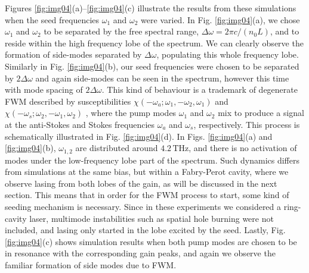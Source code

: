 \documentclass[10pt]{article}
\begin{document}
	Figures \ref{fig:img04}(a)--\ref{fig:img04}(c) illustrate the results from these simulations when the seed frequencies
	$\omega_{1}$ and $\omega_{2}$ were varied. In Fig. \ref{fig:img04}(a), we chose
	$\omega_{1}$ and $\omega_{2}$ to be separated by the free spectral range,
	$\Delta\omega=2\pi c/\left(  n_{0}L\right)  $, and to reside within the high
	frequency lobe of the spectrum. We can clearly observe the formation of
	side-modes separated by $\Delta\omega$, populating this whole frequency lobe.
	Similarly in Fig. \ref{fig:img04}(b), our seed frequencies were chosen to be
	separated by $2\Delta\omega$ and again side-modes can be seen in the spectrum,
	however this time with mode spacing of $2\Delta\omega$. This kind of behaviour
	is a trademark of degenerate FWM described by susceptibilities $\chi
	(-\omega_{a};\omega_{1},-\omega_{2},\omega_{1})$ and $\chi(-\omega_{s}%
	;\omega_{2},-\omega_{1},\omega_{2})$ \cite{butcher1991elements}, where the
	pump modes $\omega_{1}$ and $\omega_{2}$ mix to produce a signal at the
	anti-Stokes and Stokes frequencies $\omega_{a}$ and $\omega_{s}$,
	respectively. This process is schematically illustrated in Fig.
	\ref{fig:img04}(d). In Figs. \ref{fig:img04}(a) and \ref{fig:img04}(b), $\omega_{1,2}$ are distributed
	around $4.2{\,}\mathrm{THz}$, and there is no activation of modes under the
	low-frequency lobe part of the spectrum. Such dynamics differs from simulations 
	at the same bias, but within a Fabry-Perot cavity, where we observe lasing 
	from both lobes of the gain, as will be discussed in the next section. 
	This means that in order for the FWM process to start, some kind of
	seeding mechanism is necessary. Since in these experiments we considered a
	ring-cavity laser, multimode instabilities such as spatial hole burning
	\cite{gordon2008multimode} were not included, and lasing only started in the
	lobe excited by the seed. Lastly, Fig. \ref{fig:img04}(c) shows
	simulation results when both pump modes are chosen to be in resonance with the
	corresponding gain peaks, and again we observe the familiar formation of side
	modes due to FWM.
	
\end{document}
